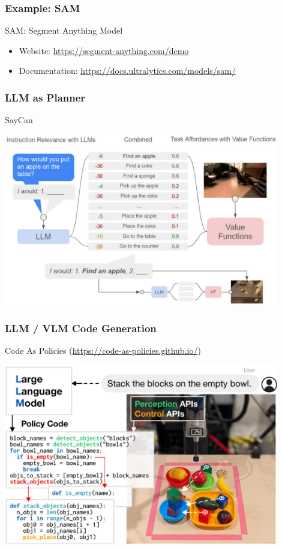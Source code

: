 \documentclass[10pt]{article}
\begin{document}
\subsubsection*{Example: SAM}
SAM: Segment Anything Model
\begin{itemize}
	\item Website: \url{https://segment-anything.com/demo}
	\item Documentation: \url{https://docs.ultralytics.com/models/sam/}
\end{itemize}

\pagebreak
\subsubsection*{LLM as Planner}
SayCan
\begin{center} 
	\includegraphics*[width=0.9\textwidth]{L1_4.png} 
\end{center}

\subsubsection*{LLM / VLM Code Generation}
Code As Policies (\url{https://code-as-policies.github.io/})
\begin{center} 
	\includegraphics*[width=0.9\textwidth]{L1_5.png} 
\end{center}
\end{document}
